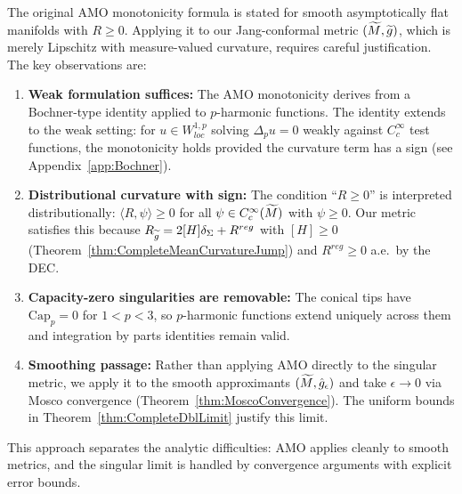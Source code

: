 \begin{remark}\label{rem:LowRegularityAMO}
The original AMO monotonicity formula \cite{amo2024} is stated for smooth asymptotically flat manifolds with $R \ge 0$. Applying it to our Jang-conformal metric $(\widetilde{M}, \widetilde{g})$, which is merely Lipschitz with measure-valued curvature, requires careful justification. The key observations are:

\begin{enumerate}
    \item \textbf{Weak formulation suffices:} The AMO monotonicity derives from a Bochner-type identity applied to $p$-harmonic functions. The identity extends to the weak setting: for $u \in W^{1,p}_{loc}$ solving $\Delta_p u = 0$ weakly against $C^\infty_c$ test functions, the monotonicity holds provided the curvature term has a sign (see Appendix~\ref{app:Bochner}).
    
    \item \textbf{Distributional curvature with sign:} The condition ``$R \ge 0$'' is interpreted distributionally: $\langle R, \psi \rangle \ge 0$ for all $\psi \in C^\infty_c(\widetilde{M})$ with $\psi \ge 0$. Our metric satisfies this because $R_{\widetilde{g}} = 2[H]\delta_\Sigma + R^{reg}$ with $[H] \ge 0$ (Theorem~\ref{thm:CompleteMeanCurvatureJump}) and $R^{reg} \ge 0$ a.e.\ by the DEC.
    
    \item \textbf{Capacity-zero singularities are removable:} The conical tips have $\mathrm{Cap}_p = 0$ for $1 < p < 3$, so $p$-harmonic functions extend uniquely across them and integration by parts identities remain valid.
    
    \item \textbf{Smoothing passage:} Rather than applying AMO directly to the singular metric, we apply it to the smooth approximants $(\widetilde{M}, \hat{g}_\epsilon)$ and take $\epsilon \to 0$ via Mosco convergence (Theorem~\ref{thm:MoscoConvergence}). The uniform bounds in Theorem~\ref{thm:CompleteDblLimit} justify this limit.
\end{enumerate}

This approach separates the analytic difficulties: AMO applies cleanly to smooth metrics, and the singular limit is handled by convergence arguments with explicit error bounds.
\end{remark}

